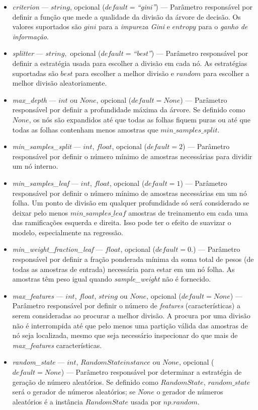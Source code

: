 \documentclass[
	12pt,				%
	oneside,			%
	a4paper,			%
	english,			%
	brazil				%
	]{abntex2ppgsi}
\begin{document}
{{{\begin{apendicesenv}
\begin{itemize}
\item \textit{criterion} --- $string$, opcional ($default=$\textit{``gini''}) --- Parâmetro responsável por definir a função que mede a qualidade da divisão da árvore de decisão. Os valores suportados são $gini$ para a \textit{impureza Gini} e $entropy$ para o \textit{ganho de informação}.
\item \textit{splitter} --- $string,$ opcional ($default=$\textit{``best''}) --- Parâmetro responsável por definir a estratégia usada para escolher a divisão em cada nó. As estratégias suportadas são $best$ para escolher a melhor divisão e $random$ para escolher a melhor divisão aleatoriamente.
\item \textit{max\_depth} --- $int$ ou $None$, opcional ($default=None$) --- Parâmetro responsável por definir a profundidade máxima da árvore. Se definido como $None$, os nós são expandidos até que todas as folhas fiquem puras ou até que todas as folhas contenham menos amostras que $min\_samples\_split$.
\item \textit{min\_samples\_split} --- $int$, $float$, opcional ($default=2$) --- Parâmetro responsável por definir o número mínimo de amostras necessárias para dividir um nó interno.
\item \textit{min\_samples\_leaf} --- $int$, $float$, opcional ($default=1$) --- Parâmetro responsável por definir o número mínimo de amostras necessárias em um nó folha. Um ponto de divisão em qualquer profundidade só será considerado se deixar pelo menos $min\_samples\_leaf$ amostras de treinamento em cada uma das ramificações esquerda e direita. Isso pode ter o efeito de suavizar o modelo, especialmente na regressão.
\item \textit{min\_weight\_fraction\_leaf} --- $float$, opcional ($default=0.$) --- Parâmetro responsável por definir a fração ponderada mínima da soma total de pesos (de todas as amostras de entrada) necessária para estar em um nó folha. As amostras têm peso igual quando \textit{sample\_weight} não é fornecido.
\item \textit{max\_features} --- $int$, $float$, $string$ ou $None$, opcional ($default=None$) --- Parâmetro responsável por definir o número de \textit{features} (características) a serem consideradas ao procurar a melhor divisão. A procura por uma divisão não é interrompida até que pelo menos uma partição válida das amostras de nó seja localizada, mesmo que seja necessário inspecionar do que mais de \textit{max\_features} características.
\item \textit{random\_state} --- $int$, $RandomState instance$ ou $None$, opcional ($default=None$) --- Parâmetro responsável por determinar a estratégia de geração de número aleatórios. Se definido como $RandomState$, $random\_state$ será o gerador de números aleatórios; se $None$ o gerador de números aleatórios é a instância $RandomState$ usada por $np.random$.

\end{itemize}
\end{apendicesenv}}}}
\end{document}
